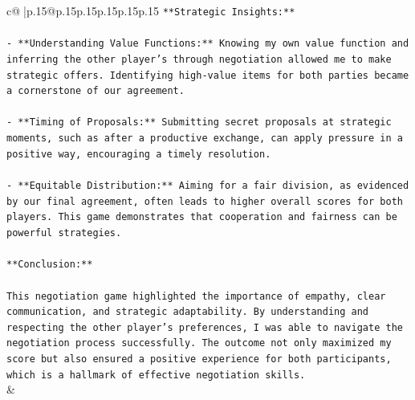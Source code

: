 \documentclass{article}
\begin{document}
{\begin{supertabular}{c@{$\;$}|p{.15\linewidth}@{}p{.15\linewidth}p{.15\linewidth}p{.15\linewidth}p{.15\linewidth}p{.15\linewidth}}
{{{\texttt{**Strategic Insights:**} \\
\\ 
\texttt{{-} **Understanding Value Functions:** Knowing my own value function and inferring the other player's through negotiation allowed me to make strategic offers. Identifying high{-}value items for both parties became a cornerstone of our agreement.} \\
\\ 
\texttt{{-} **Timing of Proposals:** Submitting secret proposals at strategic moments, such as after a productive exchange, can apply pressure in a positive way, encouraging a timely resolution.} \\
\\ 
\texttt{{-} **Equitable Distribution:** Aiming for a fair division, as evidenced by our final agreement, often leads to higher overall scores for both players. This game demonstrates that cooperation and fairness can be powerful strategies.} \\
\\ 
\texttt{**Conclusion:**} \\
\\ 
\texttt{This negotiation game highlighted the importance of empathy, clear communication, and strategic adaptability. By understanding and respecting the other player's preferences, I was able to navigate the negotiation process successfully. The outcome not only maximized my score but also ensured a positive experience for both participants, which is a hallmark of effective negotiation skills.} \\
            }
        }
    }
    & \\ \\


\end{supertabular}}
\end{document}

